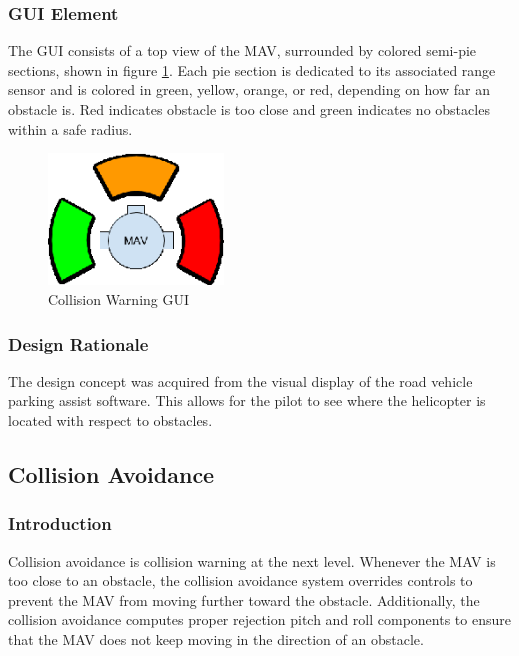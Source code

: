 \documentclass[onecolumn, oneside, letterpaper, draftclsnofoot, 10pt, compsoc]{IEEEtran}
\begin{document}
\subsubsection{GUI Element}
The GUI consists of a top view of the MAV, surrounded by colored semi-pie sections, shown in figure \ref{fig:ColWarGUI}. Each pie section is dedicated to its associated range sensor and is colored in green, yellow, orange, or red, depending on how far an obstacle is. Red indicates obstacle is too close and green indicates no obstacles within a safe radius.
\begin{figure}[h]
    \centering
    \includegraphics[height=3.5cm]{graphics/collision_warning_gui.eps}
    \caption{Collision Warning GUI}
    \label{fig:ColWarGUI}
\end{figure}

\subsubsection{Design Rationale}
The design concept was acquired from the visual display of the road vehicle parking assist software. This allows for the pilot to see where the helicopter is located with respect to obstacles.

\subsection{Collision Avoidance}
\subsubsection{Introduction}
Collision avoidance is collision warning at the next level. Whenever the MAV is too close to an obstacle, the collision avoidance system overrides controls to prevent the MAV from moving further toward the obstacle. Additionally, the collision avoidance computes proper rejection pitch and roll components to ensure that the MAV does not keep moving in the direction of an obstacle.
\end{document}

